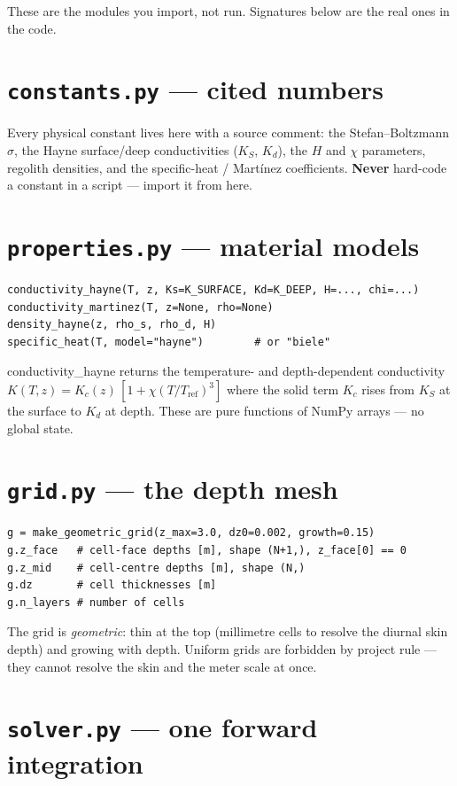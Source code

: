 \documentclass[11pt]{report}
\newcommand{\code}[1]{{\ttfamily\small #1}}
\begin{document}
These are the modules you import, not run. Signatures below are the real
ones in the code.

\section{\texttt{constants.py} --- cited numbers}

Every physical constant lives here with a source comment: the
Stefan--Boltzmann $\sigma$, the Hayne surface/deep conductivities
($K_S$, $K_d$), the $H$ and $\chi$ parameters, regolith densities, and the
specific-heat / Mart\'inez coefficients. \textbf{Never} hard-code a
constant in a script --- import it from here.

\section{\texttt{properties.py} --- material models}

\begin{lstlisting}[style=py]
conductivity_hayne(T, z, Ks=K_SURFACE, Kd=K_DEEP, H=..., chi=...)
conductivity_martinez(T, z=None, rho=None)
density_hayne(z, rho_s, rho_d, H)
specific_heat(T, model="hayne")        # or "biele"
\end{lstlisting}

\code{conductivity\_hayne} returns the temperature- and depth-dependent
conductivity $K(T,z)=K_c(z)\,[1+\chi(T/T_{\mathrm{ref}})^3]$ where the
solid term $K_c$ rises from $K_S$ at the surface to $K_d$ at depth. These
are pure functions of NumPy arrays --- no global state.

\section{\texttt{grid.py} --- the depth mesh}

\begin{lstlisting}[style=py]
g = make_geometric_grid(z_max=3.0, dz0=0.002, growth=0.15)
g.z_face   # cell-face depths [m], shape (N+1,), z_face[0] == 0
g.z_mid    # cell-centre depths [m], shape (N,)
g.dz       # cell thicknesses [m]
g.n_layers # number of cells
\end{lstlisting}

The grid is \emph{geometric}: thin at the top (millimetre cells to resolve
the diurnal skin depth) and growing with depth. Uniform grids are
forbidden by project rule --- they cannot resolve the skin and the meter
scale at once.

\section{\texttt{solver.py} --- one forward integration}
\end{document}
